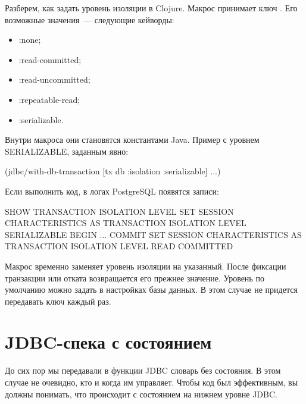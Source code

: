 Разберем, как задать уровень изоляции в Clojure. Макрос  принимает ключ . Его возможные значения~--- следующие кейворды:

\begin{itemize}

\item
  :none;

\item
  :read-committed;

\item
  :read-uncommitted;

\item
  :repeatable-read;

\item
  :serializable.

\end{itemize}

Внутри макроса они становятся константами Java. Пример с уровнем SERIALIZABLE, заданным явно:

\begin{english}
  \begin{clojure}
(jdbc/with-db-transaction
  [tx db {:isolation :serializable}]
  ...)
  \end{clojure}
\end{english}

Если выполнить код, в логах PostgreSQL появятся записи:

\begin{english}
  \begin{sql}
SHOW TRANSACTION ISOLATION LEVEL
SET SESSION CHARACTERISTICS
  AS TRANSACTION ISOLATION LEVEL SERIALIZABLE
BEGIN
...
COMMIT
SET SESSION CHARACTERISTICS
  AS TRANSACTION ISOLATION LEVEL READ COMMITTED
  \end{sql}
\end{english}

Макрос временно заменяет уровень изоляции на указанный. После фиксации транзакции или отката возвращается его прежнее значение. Уровень по умолчанию можно задать в настройках базы данных. В этом случае не придется передавать ключ  каждый раз.

\section{JDBC-спека с состоянием}

До сих пор мы передавали в функции JDBC словарь без состояния. В этом случае не очевидно, кто и когда им управляет. Чтобы код был эффективным, вы должны понимать, что происходит с состоянием на нижнем уровне JDBC.

